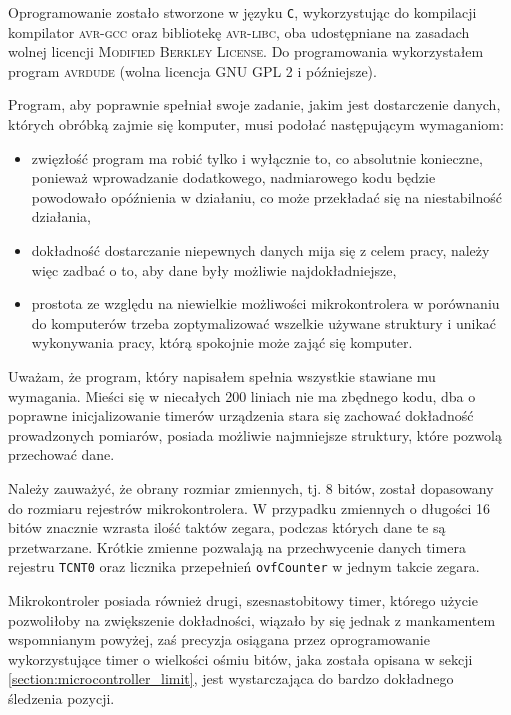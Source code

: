 Oprogramowanie zostało stworzone w języku \texttt{C}, wykorzystując do kompilacji kompilator \textsc{avr-gcc} oraz bibliotekę \textsc{avr-libc}, oba udostępniane na zasadach wolnej licencji \textsc{Modified Berkley License}. Do programowania wykorzystałem program \textsc{avrdude} (wolna licencja \textsc{GNU GPL 2} i późniejsze).

Program, aby poprawnie spełniał swoje zadanie, jakim jest dostarczenie danych, których obróbką zajmie się komputer, musi podołać następującym wymaganiom:
\begin{itemize}
 \item zwięzłość \ppauza program ma robić tylko i wyłącznie to, co absolutnie konieczne, ponieważ wprowadzanie dodatkowego, nadmiarowego kodu będzie powodowało opóźnienia w działaniu, co może przekładać się na
    niestabilność działania,
 \item dokładność \ppauza dostarczanie niepewnych danych mija się z celem pracy, należy więc zadbać o to, aby dane były możliwie najdokładniejsze,
 \item prostota \ppauza ze względu na niewielkie możliwości mikrokontrolera \ppauza w porównaniu do komputerów \ppauza trzeba zoptymalizować wszelkie używane struktury i unikać wykonywania pracy, którą spokojnie może zająć się komputer.
\end{itemize}

Uważam, że program, który napisałem spełnia wszystkie stawiane mu wymagania. Mieści się w niecałych 200 liniach \ppauza nie ma zbędnego kodu, dba o poprawne inicjalizowanie timerów urządzenia \ppauza stara się zachować dokładność prowadzonych pomiarów, posiada możliwie najmniejsze struktury, które pozwolą przechować dane.

Należy zauważyć, że obrany rozmiar zmiennych, tj. 8 bitów, został dopasowany do rozmiaru rejestrów mikrokontrolera. W przypadku zmiennych o długości 16 bitów znacznie wzrasta ilość taktów zegara, podczas których dane te są przetwarzane. Krótkie zmienne pozwalają na przechwycenie danych timera \ppauza rejestru \texttt{TCNT0} oraz licznika przepełnień \texttt{ovfCounter} \ppauza w jednym takcie zegara.

Mikrokontroler posiada również drugi, szesnastobitowy timer, którego użycie pozwoliłoby na zwiększenie dokładności, wiązało by się jednak z mankamentem wspomnianym powyżej, zaś precyzja osiągana przez oprogramowanie wykorzystujące timer o wielkości ośmiu bitów, jaka została opisana w sekcji \ref{section:microcontroller_limit}, jest wystarczająca do bardzo dokładnego śledzenia pozycji.


